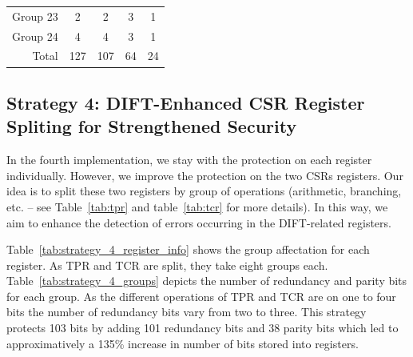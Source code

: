 \begin{table}[t]
\begin{tabular}{@{}rcccc@{}}
        Group 23 & 2                               & 2                                         & 3                                          & 1                                      \\
        Group 24 & 4                               & 4                                         & 3                                          & 1                                      \\ \midrule
        Total    & 127                             & 107                                       & 64                                         & 24                                     \\
        \bottomrule
    \end{tabular}
\end{table}

\subsection{Strategy 4: DIFT-Enhanced CSR Register Spliting for Strengthened Security}

In the fourth implementation, we stay with the protection on each register individually. However, we improve the protection on the two CSRs registers. Our idea is to split these two registers by group of operations (arithmetic, branching, etc. -- see Table~\ref{tab:tpr} and table~\ref{tab:tcr} for more details). In this way, we aim to enhance the detection of errors occurring in the DIFT-related registers.

Table~\ref{tab:strategy_4_register_info} shows the group affectation for each register. As TPR and TCR are split, they take eight groups each.
Table~\ref{tab:strategy_4_groups} depicts the number of redundancy and parity bits for each group. As the different operations of TPR and TCR are on one to four bits the number of redundancy bits vary from two to three. This strategy protects 103 bits by adding 101 redundancy bits and 38 parity bits which led to approximatively a 135\% increase in number of bits stored into registers.

